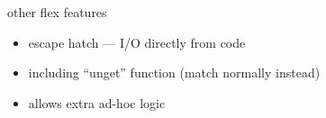 
\begin{frame}{other flex features}
    \begin{itemize}
    \item escape hatch --- I/O directly from code
    \item including ``unget'' function (match normally instead)
    \item allows extra ad-hoc logic
    \end{itemize}
\end{frame}

